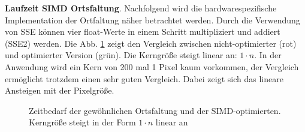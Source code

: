 \documentclass[a4paper,12pt]{article}
\begin{document}
\textbf{Laufzeit SIMD Ortsfaltung}. Nachfolgend wird die hardwarespezifische
Implementation der Ortfaltung näher betrachtet werden. Durch die Verwendung von
SSE können vier float-Werte in einem Schritt multipliziert und addiert (SSE2)
werden. Die Abb. \ref{figure_simd_vs_con} zeigt den Vergleich zwischen
nicht-optimierter (rot) und optimierter Version (grün). Die Kerngröße steigt
linear an:
$1 \cdot n$. In der Anwendung wird ein Kern von 200 mal 1 Pixel kaum vorkommen,
der Vergleich ermöglicht trotzdem einen sehr guten Vergleich. Dabei zeigt sich das
lineare Ansteigen mit der Pixelgröße. 
\\




\begin{figure}[htbp]
\caption{Zeitbedarf der gewöhnlichen Ortsfaltung und der SIMD-optimierten.
Kerngröße steigt in der Form $1 \cdot n$ linear an}%
\label{figure_simd_vs_con}
\end{figure}
\end{document}
